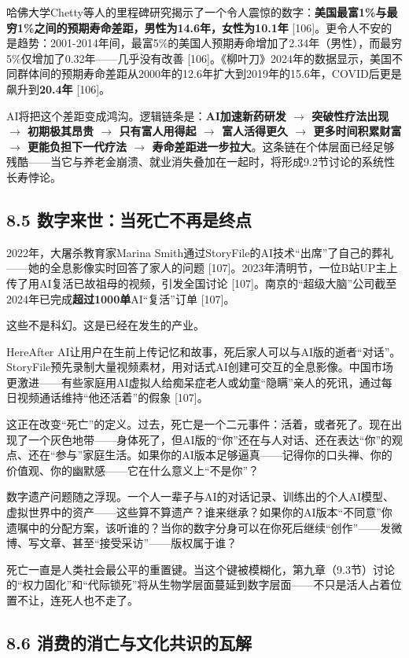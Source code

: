 \documentclass[11pt,a4paper]{ctexart}
\begin{document}
哈佛大学Chetty等人的里程碑研究揭示了一个令人震惊的数字：\textbf{美国最富1\%与最穷1\%之间的预期寿命差距，男性为14.6年，女性为10.1年}{} [106]。更令人不安的是趋势：2001-2014年间，最富5\%的美国人预期寿命增加了2.34年（男性），而最穷5\%仅增加了0.32年——几乎没有改善 [106]。《柳叶刀》2024年的数据显示，美国不同群体间的预期寿命差距从2000年的12.6年扩大到2019年的15.6年，COVID后更是飙升到\textbf{20.4年}{} [106]。

AI将把这个差距变成鸿沟。逻辑链条是：\textbf{AI加速新药研发 $\to$ 突破性疗法出现 $\to$ 初期极其昂贵 $\to$ 只有富人用得起 $\to$ 富人活得更久 $\to$ 更多时间积累财富 $\to$ 更能负担下一代疗法 $\to$ 寿命差距进一步拉大}。这条链在个体层面已经足够残酷——当它与养老金崩溃、就业消失叠加在一起时，将形成9.2节讨论的系统性长寿悖论。

\subsection{8.5 数字来世：当死亡不再是终点}

2022年，大屠杀教育家Marina Smith通过StoryFile的AI技术“出席”了自己的葬礼——她的全息影像实时回答了家人的问题 [107]。2023年清明节，一位B站UP主上传了用AI复活已故祖母的视频，引发全国讨论 [107]。南京的“超级大脑”公司截至2024年已完成\textbf{超过1000单}AI“复活”订单 [107]。

这些不是科幻。这是已经在发生的产业。

HereAfter AI让用户在生前上传记忆和故事，死后家人可以与AI版的逝者“对话”。StoryFile预先录制大量视频素材，用对话式AI创建可交互的全息影像。中国市场更激进——有些家庭用AI虚拟人给痴呆症老人或幼童“隐瞒”亲人的死讯，通过每日视频通话维持“他还活着”的假象 [107]。

这正在改变“死亡”的定义。过去，死亡是一个二元事件：活着，或者死了。现在出现了一个灰色地带——身体死了，但AI版的“你”还在与人对话、还在表达“你”的观点、还在“参与”家庭生活。如果你的AI版本足够逼真——记得你的口头禅、你的价值观、你的幽默感——它在什么意义上“不是你”？

数字遗产问题随之浮现。一个人一辈子与AI的对话记录、训练出的个人AI模型、虚拟世界中的资产——这些算不算遗产？谁来继承？如果你的AI版本“不同意”你遗嘱中的分配方案，该听谁的？当你的数字分身可以在你死后继续“创作”——发微博、写文章、甚至“接受采访”——版权属于谁？

死亡一直是人类社会最公平的重置键。当这个键被模糊化，第九章（9.3节）讨论的“权力固化”和“代际锁死”将从生物学层面蔓延到数字层面——不只是活人占着位置不让，连死人也不走了。

\subsection{8.6 消费的消亡与文化共识的瓦解}
\end{document}
